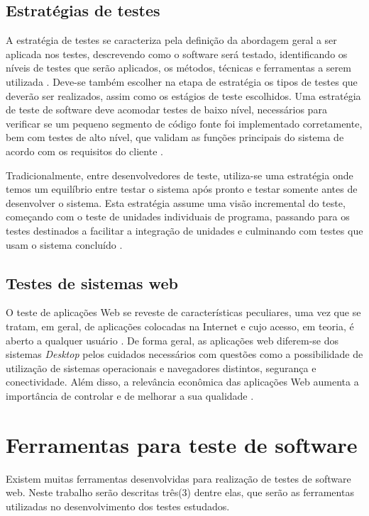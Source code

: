 \documentclass[tg]{mdtufsm}
\begin{document}
\subsection{Estratégias de testes}
A estratégia de testes se caracteriza pela definição da abordagem geral a ser aplicada nos testes, descrevendo como o software será testado, identificando os níveis de testes que serão aplicados, os métodos,
técnicas e ferramentas a serem utilizada \cite{rios2006teste}. Deve-se também escolher na etapa de estratégia os tipos de testes que deverão ser realizados, assim como os estágios de teste escolhidos. Uma estratégia de teste de software deve acomodar testes de baixo nível, necessários para verificar se um pequeno segmento de código fonte foi implementado corretamente, bem com testes de alto nível, que validam as funções principais do sistema de acordo com os requisitos do cliente \cite{pressman2011engenharia}.

Tradicionalmente, entre desenvolvedores de teste, utiliza-se uma estratégia onde temos um equilíbrio entre testar o sistema após pronto e testar somente antes de desenvolver o sistema. Esta estratégia assume uma visão incremental do teste, começando com o teste de unidades individuais de programa, passando para os testes destinados a facilitar a integração de unidades e culminando com testes que usam o sistema concluído \cite{pressman2011engenharia}.

\subsection{Testes de sistemas web}
O teste de aplicações Web se reveste de características peculiares, uma vez que se tratam, em geral, de aplicações colocadas na Internet e cujo acesso, em teoria,
é aberto a qualquer usuário \cite{rios2006teste}.  De forma geral, as aplicações web diferem-se dos sistemas \emph{Desktop} pelos cuidados necessários com questões como a
possibilidade de utilização de sistemas operacionais e navegadores distintos, segurança e conectividade. Além disso, a relevância econômica das aplicações Web aumenta a
importância de controlar e de melhorar a sua qualidade \cite{fidelis2004fireweb}.


\section{Ferramentas para teste de software}
Existem muitas ferramentas desenvolvidas para realização de testes de software web. Neste trabalho serão descritas três(3) dentre elas, que serão as ferramentas utilizadas no desenvolvimento dos testes estudados.
\end{document}
